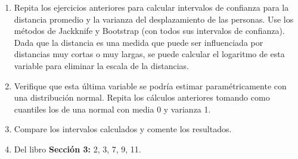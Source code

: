 \documentclass[
  12pt,
]{book}
\theoremstyle{definition}
\theoremstyle{definition}
\theoremstyle{definition}
\theoremstyle{definition}
\theoremstyle{remark}
\begin{document}
\begin{enumerate}
\def\labelenumi{\arabic{enumi}.}
\item
  Repita los ejercicios anteriores para calcular intervalos de confianza para la distancia promedio y la varianza del desplazamiento de las personas. Use los métodos de Jackknife y Bootstrap (con todos sus intervalos de confianza).
  Dada que la distancia es una medida que puede ser influenciada por distancias muy cortas o muy largas, se puede calcular el logaritmo de esta variable para eliminar la escala de la distancias.
\item
  Verifique que esta última variable se podría estimar paramétricamente con una distribución normal.
  Repita los cálculos anteriores tomando como cuantiles los de una normal con media 0 y varianza 1.
\item
  Compare los intervalos calculados y comente los resultados.
\item
  Del libro \autocite{Wasserman2006} \textbf{Sección 3:} 2, 3, 7, 9, 11.
\end{enumerate}

\backmatter

\printbibliography
\end{document}
